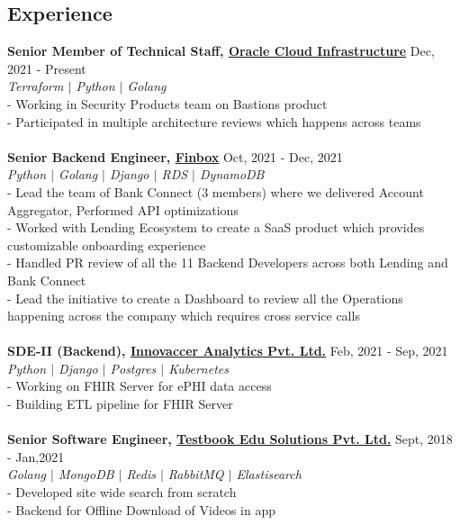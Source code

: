 \documentclass[margin, centered]{res}
\begin{document}
\begin{resume}
\section{Experience}
\textbf{Senior Member of Technical Staff, \href{https://www.oracle.com/cloud/}{Oracle Cloud Infrastructure}} \hfill Dec, 2021 - Present\\
\emph{\color{BlueViolet}Terraform $\vert$ Python $\vert$ Golang} \\
- Working in Security Products team on Bastions product \\
- Participated in multiple architecture reviews which happens across teams \\
\\
\textbf{Senior Backend Engineer, \href{https://finbox.in}{Finbox}} \hfill Oct, 2021 - Dec, 2021\\
\emph{\color{BlueViolet}Python $\vert$ Golang $\vert$ Django $\vert$ RDS $\vert$ DynamoDB} \\
- Lead the team of Bank Connect (3 members) where we delivered Account Aggregator, Performed API optimizations \\
- Worked with Lending Ecosystem to create a SaaS product which provides customizable onboarding experience \\
- Handled PR review of all the 11 Backend Developers across both Lending and Bank Connect \\
- Lead the initiative to create a Dashboard to review all the Operations happening across the company which requires cross service calls \\
\\
\textbf{SDE-II (Backend), \href{https://testbook.com}{Innovaccer Analytics Pvt. Ltd.}} \hfill Feb, 2021 - Sep, 2021\\
\emph{\color{BlueViolet}Python $\vert$ Django $\vert$ Postgres $\vert$ Kubernetes } \\
- Working on FHIR Server for ePHI data access \\
- Building ETL pipeline for FHIR Server \\
\\
\textbf{Senior Software Engineer, \href{https://testbook.com}{Testbook Edu Solutions Pvt. Ltd.}} \hfill Sept, 2018 - Jan,2021\\
\emph{\color{BlueViolet}Golang $\vert$ MongoDB $\vert$ Redis $\vert$ RabbitMQ $\vert$ Elastisearch} \\
- Developed site wide search from scratch\\
- Backend for Offline Download of Videos in app \\

\end{resume}
\end{document}
